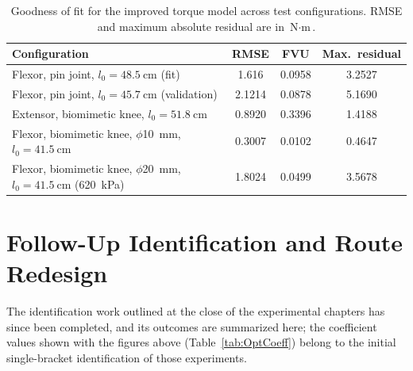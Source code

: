 \begin{table}[htbp]
\caption{Goodness of fit for the improved torque model across test configurations. RMSE and maximum absolute residual are in $\text{N}\cdot\text{m}$.}
\label{tab:TorqueFit}
\begin{tabular}{@{}lccc@{}}
\toprule
\textbf{Configuration} & \textbf{RMSE} & \textbf{FVU} & \textbf{Max.\ residual} \\
\midrule
Flexor, pin joint, $l_{0}=\qty{48.5}{\cm}$ (fit) & 1.616 & 0.0958 & 3.2527 \\
Flexor, pin joint, $l_{0}=\qty{45.7}{\cm}$ (validation) & 2.1214 & 0.0878 & 5.1690 \\
Extensor, biomimetic knee, $l_{0}=\qty{51.8}{\cm}$ & 0.8920 & 0.3396 & 1.4188 \\
Flexor, biomimetic knee, $\phi$\qty{10}{\mm}, $l_{0}=\qty{41.5}{\cm}$ & 0.3007 & 0.0102 & 0.4647 \\
Flexor, biomimetic knee, $\phi$\qty{20}{\mm}, $l_{0}=\qty{41.5}{\cm}$ (\qty{620}{\kPa}) & 1.8024 & 0.0499 & 3.5678 \\
\bottomrule
\end{tabular}
\end{table}

\section{Follow-Up Identification and Route Redesign}\label{sec:ongoing}

The identification work outlined at the close of the experimental chapters has since been completed, and its outcomes are summarized here; the coefficient values shown with the figures above (Table~\ref{tab:OptCoeff}) belong to the initial single-bracket identification of those experiments.

